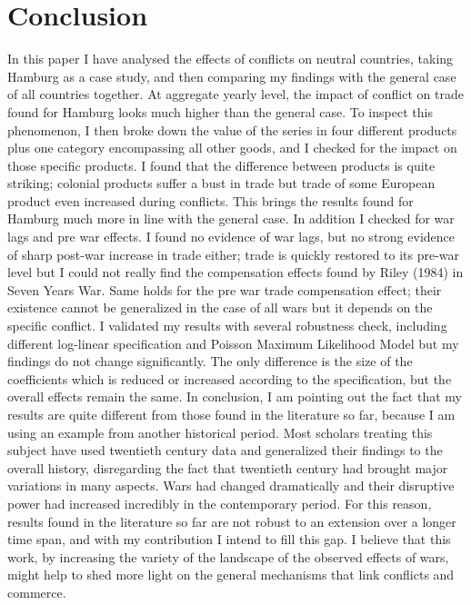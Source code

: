 \documentclass[12pt,a4paper,titlepage,english]{article}
\begin{document}
\section{Conclusion}
In this paper I have analysed the effects of conflicts on neutral countries, taking Hamburg as a case study, and then comparing my findings with the general case of all countries together. At aggregate yearly level, the impact of conflict on trade found for Hamburg looks much higher than the general case. To inspect this phenomenon, I then broke down the value of the series in four different products plus one category encompassing all other goods, and I checked for the impact on those specific products. I found that the difference between products is quite striking; colonial products suffer a bust in trade but trade of some European product even increased during conflicts. This brings the results found for Hamburg much more in line with the general case. In addition I checked for war lags and pre war effects. I found no evidence of war lags, but no strong evidence of sharp post-war increase in trade either; trade is quickly restored to its pre-war level but I could not really find the compensation effects found by Riley (1984) in Seven Years War. Same holds for the pre war trade compensation effect; their existence cannot be generalized in the case of all wars but it depends on the specific conflict. I validated my results with several robustness check, including different log-linear specification and Poisson Maximum Likelihood Model but my findings do not change significantly. The only difference is the size of the coefficients which is reduced or increased according to the specification, but the overall effects remain the same. 
In conclusion, I am pointing out the fact that my results are quite different from those found in the literature so far, because I am using an example from another historical period. Most scholars treating this subject have used twentieth century data and generalized their findings to the overall history, disregarding the fact that twentieth century had brought major variations in many aspects. Wars had changed dramatically and their disruptive power had increased incredibly in the contemporary period. For this reason, results found in the literature so far are not robust to an extension over a longer time span, and with my contribution I intend to fill this gap. I believe that this work, by increasing the variety of the landscape of the observed effects of wars, might help to shed more light on the general mechanisms that link conflicts and commerce.
\end{document}
